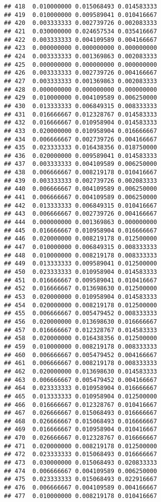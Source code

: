\documentclass[
]{article}
\begin{document}
\begin{verbatim}
## 418  0.010000000 0.015068493 0.014583333
## 419  0.010000000 0.009589041 0.010416667
## 420  0.003333333 0.002739726 0.002083333
## 421  0.030000000 0.024657534 0.035416667
## 422  0.003333333 0.004109589 0.004166667
## 423  0.000000000 0.000000000 0.000000000
## 424  0.003333333 0.001369863 0.002083333
## 425  0.000000000 0.000000000 0.000000000
## 426  0.003333333 0.002739726 0.004166667
## 427  0.003333333 0.001369863 0.002083333
## 428  0.000000000 0.000000000 0.000000000
## 429  0.010000000 0.004109589 0.006250000
## 430  0.013333333 0.006849315 0.008333333
## 431  0.016666667 0.012328767 0.014583333
## 432  0.016666667 0.010958904 0.014583333
## 433  0.020000000 0.010958904 0.016666667
## 434  0.006666667 0.002739726 0.004166667
## 435  0.023333333 0.016438356 0.018750000
## 436  0.020000000 0.009589041 0.014583333
## 437  0.003333333 0.004109589 0.006250000
## 438  0.006666667 0.008219178 0.010416667
## 439  0.003333333 0.002739726 0.002083333
## 440  0.006666667 0.004109589 0.006250000
## 441  0.006666667 0.004109589 0.006250000
## 442  0.013333333 0.006849315 0.010416667
## 443  0.006666667 0.002739726 0.004166667
## 444  0.000000000 0.001369863 0.000000000
## 445  0.016666667 0.010958904 0.016666667
## 446  0.020000000 0.008219178 0.012500000
## 447  0.010000000 0.006849315 0.008333333
## 448  0.010000000 0.008219178 0.008333333
## 449  0.013333333 0.009589041 0.012500000
## 450  0.023333333 0.010958904 0.014583333
## 451  0.016666667 0.009589041 0.010416667
## 452  0.016666667 0.013698630 0.012500000
## 453  0.020000000 0.010958904 0.014583333
## 454  0.020000000 0.008219178 0.012500000
## 455  0.006666667 0.005479452 0.008333333
## 456  0.020000000 0.013698630 0.016666667
## 457  0.016666667 0.012328767 0.014583333
## 458  0.020000000 0.016438356 0.012500000
## 459  0.010000000 0.008219178 0.008333333
## 460  0.006666667 0.005479452 0.004166667
## 461  0.006666667 0.008219178 0.008333333
## 462  0.020000000 0.013698630 0.014583333
## 463  0.006666667 0.005479452 0.004166667
## 464  0.023333333 0.010958904 0.016666667
## 465  0.013333333 0.010958904 0.012500000
## 466  0.016666667 0.012328767 0.010416667
## 467  0.026666667 0.015068493 0.016666667
## 468  0.026666667 0.015068493 0.016666667
## 469  0.016666667 0.010958904 0.010416667
## 470  0.026666667 0.012328767 0.016666667
## 471  0.020000000 0.008219178 0.012500000
## 472  0.023333333 0.015068493 0.016666667
## 473  0.030000000 0.015068493 0.020833333
## 474  0.006666667 0.004109589 0.006250000
## 475  0.023333333 0.015068493 0.022916667
## 476  0.006666667 0.004109589 0.004166667
## 477  0.010000000 0.008219178 0.010416667

\end{verbatim}
\end{document}
